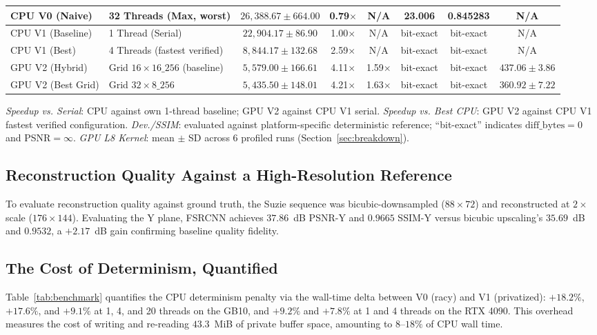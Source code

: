 \documentclass[conference]{IEEEtran}
\begin{document}
\begin{table}[htbp]
{\begin{tabular}{|l|l|c|c|c|c|c|c|}
\hline
CPU V0 (Naive) & 32 Threads (Max, worst) & $26{,}388.67 \pm 664.00$ & 0.79$\times$ & N/A & 23.006 & 0.845283 & N/A \\
\hline
CPU V1 (Baseline) & 1 Thread (Serial) & $22{,}904.17 \pm 86.90$ & 1.00$\times$ & N/A & bit-exact & bit-exact & N/A \\
\hline
CPU V1 (Best) & 4 Threads (fastest verified) & $8{,}844.17 \pm 132.68$ & 2.59$\times$ & N/A & bit-exact & bit-exact & N/A \\
\hline
GPU V2 (Hybrid) & Grid $16{\times}16\_256$ (baseline) & $5{,}579.00 \pm 166.61$ & 4.11$\times$ & 1.59$\times$ & bit-exact & bit-exact & $437.06 \pm 3.86$ \\
\hline
GPU V2 (Best Grid) & Grid $32{\times}8\_256$ & $5{,}435.50 \pm 148.01$ & 4.21$\times$ & 1.63$\times$ & bit-exact & bit-exact & $360.92 \pm 7.22$ \\
\hline
\end{tabular}%
}

\vspace{0.5ex}
\begin{minipage}{\textwidth}
\footnotesize
\emph{Speedup vs. Serial}: CPU against own 1-thread baseline; GPU V2 against CPU V1 serial. \emph{Speedup vs. Best CPU}: GPU V2 against CPU V1 fastest verified configuration. \emph{Dev./SSIM}: evaluated against platform-specific deterministic reference; ``bit-exact'' indicates $\text{diff\_bytes}=0$ and PSNR$=\infty$. \emph{GPU L8 Kernel}: mean $\pm$ SD across 6 profiled runs (Section~\ref{sec:breakdown}).
\end{minipage}
\end{table}

\subsection{Reconstruction Quality Against a High-Resolution Reference}
\label{sec:quality}
To evaluate reconstruction quality against ground truth, the Suzie sequence was bicubic-downsampled ($88{\times}72$) and reconstructed at $2\times$ scale ($176{\times}144$). Evaluating the Y plane, FSRCNN achieves $37.86$~dB PSNR-Y and $0.9665$ SSIM-Y versus bicubic upscaling's $35.69$~dB and $0.9532$, a $+2.17$~dB gain confirming baseline quality fidelity.

\subsection{The Cost of Determinism, Quantified}
\label{sec:cost-of-determinism}
Table~\ref{tab:benchmark} quantifies the CPU determinism penalty via the wall-time delta between V0 (racy) and V1 (privatized): $+18.2\%$, $+17.6\%$, and $+9.1\%$ at 1, 4, and 20 threads on the GB10, and $+9.2\%$ and $+7.8\%$ at 1 and 4 threads on the RTX 4090. This overhead measures the cost of writing and re-reading $43.3$~MiB of private buffer space, amounting to $8$--$18\%$ of CPU wall time.
\end{document}
